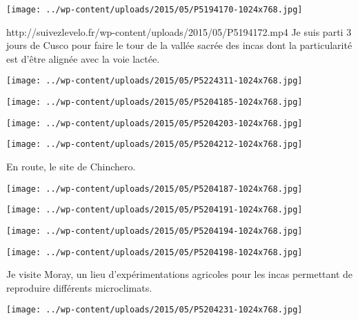 \centerline{\texttt{[image: ../wp-content/uploads/2015/05/P5194170-1024x768.jpg]} } 
 \newline
  \newline
 http://suivezlevelo.fr/wp-content/uploads/2015/05/P5194172.mp4 \newline
 Je suis parti 3 jours de Cusco pour faire le tour de la vallée sacrée des incas dont la particularité est d'être alignée avec la voie lactée. \newline
 \newline
\centerline{\texttt{[image: ../wp-content/uploads/2015/05/P5224311-1024x768.jpg]} } 
 \newline
 \newline
\centerline{\texttt{[image: ../wp-content/uploads/2015/05/P5204185-1024x768.jpg]} } 
 \newline
 \newline
\centerline{\texttt{[image: ../wp-content/uploads/2015/05/P5204203-1024x768.jpg]} } 
 \newline
 \newline
\centerline{\texttt{[image: ../wp-content/uploads/2015/05/P5204212-1024x768.jpg]} } 
 \newline
 En route, le site de Chinchero. \newline
 \newline
\centerline{\texttt{[image: ../wp-content/uploads/2015/05/P5204187-1024x768.jpg]} } 
 \newline
 \newline
\centerline{\texttt{[image: ../wp-content/uploads/2015/05/P5204191-1024x768.jpg]} } 
 \newline
 \newline
\centerline{\texttt{[image: ../wp-content/uploads/2015/05/P5204194-1024x768.jpg]} } 
 \newline
 \newline
\centerline{\texttt{[image: ../wp-content/uploads/2015/05/P5204198-1024x768.jpg]} } 
 \newline
 Je visite Moray, un lieu d'expérimentations agricoles pour les incas permettant de reproduire différents microclimats. \newline
 \newline
\centerline{\texttt{[image: ../wp-content/uploads/2015/05/P5204231-1024x768.jpg]} } 
 \newline
 \newline
